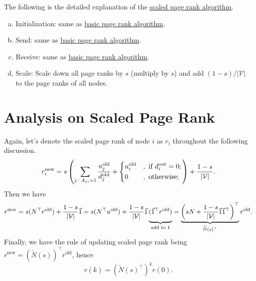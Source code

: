 \begin{remark}
	The following is the detailed explanation of the \hyperref[algo:scaled-page-rank-algorithm]{scaled page rank algorithm}.
	\begin{enumerate}[(a)]
		\item \label{algo:scaled-page-rank-algorithm:initialize} Initialization: same as \hyperref[algo:basic-page-rank-algorithm]{basic page rank algorithm}.
		\item \label{algo:scaled-page-rank-algorithm:send} Send: same as \hyperref[algo:basic-page-rank-algorithm]{basic page rank algorithm}.
		\item \label{algo:scaled-page-rank-algorithm:receive} Receive: same as \hyperref[algo:basic-page-rank-algorithm]{basic page rank algorithm}.
		\item \label{algo:scaled-page-rank-algorithm:scale} Scale: Scale down all page ranks by \(s\) (multiply by \(s\)) and
		      add \((1-s) / \left\vert \mathcal{V} \right\vert \) to the page ranks of all nodes.
	\end{enumerate}
\end{remark}

\section{Analysis on Scaled Page Rank}
Again, let's denote the scaled page rank of node \(i\) as \(r_i\) throughout the following discussion.
\[
	r_{i}^{\text{new}} = s\left(\sum\limits_{j\colon A_{ji} = 1} \frac{u_{j}^{\text{old}}}{d_{j}^{\text{old}}}+\begin{dcases}
		u_{i}^{\text{old}} & , \text{ if }d_{i}^{\text{out}} = 0; \\
		0                  & , \text{ otherwise};
	\end{dcases}\right)+\frac{1-s}{\vert \mathcal{V}\vert}.
\]
Then we have
\[
	\begin{split}
		r^{\text{new}} = s(N^{\top}r^{\text{old}})+\frac{1-s}{\vert \mathcal{V}\vert}\vec{1}
		= s(N^{\top}u^{\text{old}}) + \frac{1-s}{\vert \mathcal{V}\vert}\vec{1} \underbrace{\vphantom{\left(sN + \frac{1-s}{\vert \mathcal{V}\vert}\vec{1}\vec{1}^{\top}\right)^{\top}}(\vec{1}^{\top}r^{\text{old}})}_{\text{add to }1}
		= \underbrace{\left(sN + \frac{1-s}{\vert \mathcal{V}\vert}\vec{1}\vec{1}^{\top}\right)^{\top}}_{\widetilde{N}(s)^{\top}} r^{\text{old}}.
	\end{split}
\]
Finally, we have the rule of updating scaled page rank being \(r^{\text{new}} = (\widetilde{N}(s))^{\top}r^{\text{old}}\), hence
\[
	r(k) = \left(\widetilde{N}(s)^{\top}\right)^k r(0).
\]

